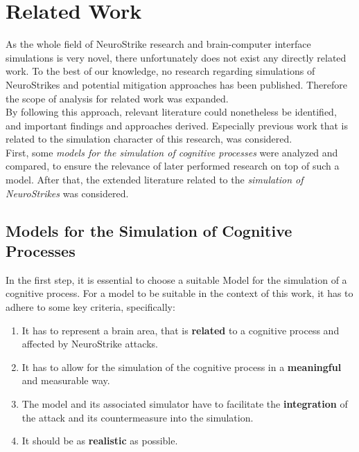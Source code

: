 \chapter{Related Work} %
\label{chap:related-work}


As the whole field of NeuroStrike research and brain-computer interface simulations is very novel, there unfortunately does not exist any directly related work. To the best of our knowledge, no research regarding simulations of NeuroStrikes and potential mitigation approaches has been published. Therefore the scope of analysis for related work was expanded. \\
By following this approach, relevant literature could nonetheless be identified, and important findings and approaches derived. Especially previous work that is related to the simulation character of this research, was considered.\\
First, some \textit{models for the simulation of cognitive processes} were analyzed and compared, to ensure the relevance of later performed research on top of such a model. After that, the extended literature related to the \textit{simulation of NeuroStrikes} was considered. 


\section{Models for the Simulation of Cognitive Processes}
    In the first step, it is essential to choose a suitable Model for the simulation of a cognitive process. For a model to be suitable in the context of this work, it has to adhere to some key criteria, specifically:
    \begin{enumerate}
        \item It has to represent a brain area, that is \textbf{related} to a cognitive process and affected by NeuroStrike attacks.
        \item It has to allow for the simulation of the cognitive process in a \textbf{meaningful} and measurable way.
        \item The model and its associated simulator have to facilitate the \textbf{integration} of the attack and its countermeasure into the simulation.
        \item It should be as \textbf{realistic} as possible.
    \end{enumerate}

